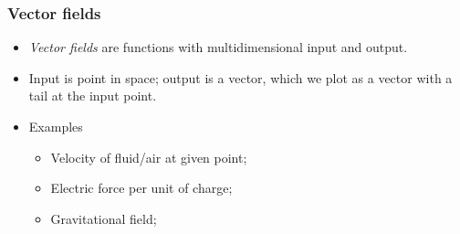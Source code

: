 \begin{frame}
\frametitle{Vector fields}
\begin{itemize}
\item \emph{Vector fields} are functions with multidimensional input and output. 
\item Input is point in space; output is a vector, which we plot as a vector with a tail at the input point. 
\item Examples
\begin{itemize}
  \item Velocity of fluid/air at given point;
  \item Electric force per unit of charge;
  \item Gravitational field;
\end{itemize}
\end{itemize}
\end{frame}

